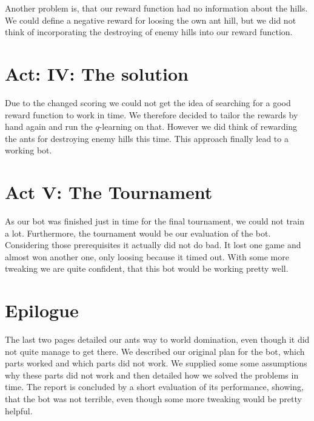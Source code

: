 \documentclass{article}
\begin{document}
Another problem is, that our reward function had no information about the hills. We could define a
negative reward for loosing the own ant hill, but we did not think of incorporating the destroying
of enemy hills into our reward function.
\section*{Act: IV: The solution}
Due to the changed scoring we could not get the idea of searching for a good reward function to
work in time. We therefore decided to tailor the rewards by hand again and run the $q$-learning on
that. However we did think of rewarding the ants for destroying enemy hills this time. This approach
finally lead to a working bot.
\section*{Act V: The Tournament}
As our bot was finished just in time for the final tournament, we could not train a lot.
Furthermore, the tournament would be our evaluation of the bot. Considering those prerequisites it
actually did not do bad. It lost one game and almost won another one, only loosing because it timed
out. With some more tweaking we are quite confident, that this bot would be working pretty well.
\section*{Epilogue}
The last two pages detailed our ants way to world domination, even though it did not quite manage to
get there. We described our original plan for the bot, which parts worked and which parts did not
work. We supplied some some assumptions why these parts did not work and then detailed how we solved
the problems in time. The report is concluded by a short evaluation of its performance, showing,
that the bot was not terrible, even though some more tweaking would be pretty helpful.
\end{document}
